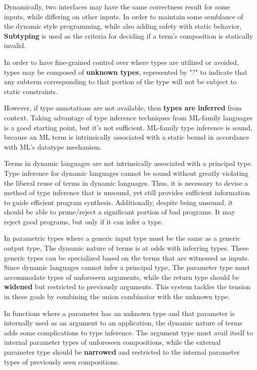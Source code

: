 \documentclass[sigplan,screen]{acmart}
\begin{document}
Dynamically, two interfaces may have the same correctness result for some inputs,
while differing on other inputs.  
In order to maintain some semblance of the dynamic style programming,
while also adding safety with static behavior,  
\textbf{Subtyping} is used as the criteria for deciding if a term's 
composition is statically invalid.   


In order to have fine-grained control over where types are utilized or avoided, 
types may be composed of \textbf{unknown types}, represented by "?" to indicate 
that any subterm corresponding to that portion of the type 
will not be subject to static constraints.

However, if type annotations are not available, then \textbf{types are inferred} from context. 
Taking advantage of type inference techniques from ML-family languages is a good starting point,
but it's not sufficient. ML-family type inference is sound, because an ML term is 
intrinsically associated with a static bound in accordance with ML's datatype mechanism.

Terms in dynamic languages are not intrinsically associated with a principal type. 
Type inference for dynamic languages cannot be sound without greatly violating the 
liberal reuse of terms in dynamic languages. 
Thus, it is necessary to devise a method of type inference that is unsound, 
yet still provides sufficient information to guide efficient program synthesis.
Additionally, despite being unsound, it should be able to prune/reject 
a significant portion of bad programs. 
It may reject good programs, but only if it can infer a type.

In parametric types where a generic input type must be the same as a generic output type,
The dynamic nature of terms is at odds with inferring types.
These generic types can be specialized based on the terms that are witnessed as inputs. 
Since dynamic languages cannot infer a principal type, 
The parameter type must accommodate types of unforeseen arguments, 
while the return type should be \textbf{widened} but restricted to previously arguments.
This system tackles the tension in these goals by combining the union combinator  
with the unknown type. 

In functions where a parameter has an unknown type and that parameter is 
internally used as an argument to an application, the dynamic nature of terms  
adds some complications to type inference.
The argument type must avail itself to internal parameter types of unforeseen compositions,
while the external parameter type should be \textbf{narrowed} and restricted 
to the internal parameter types of previously seen compositions.
\end{document}
